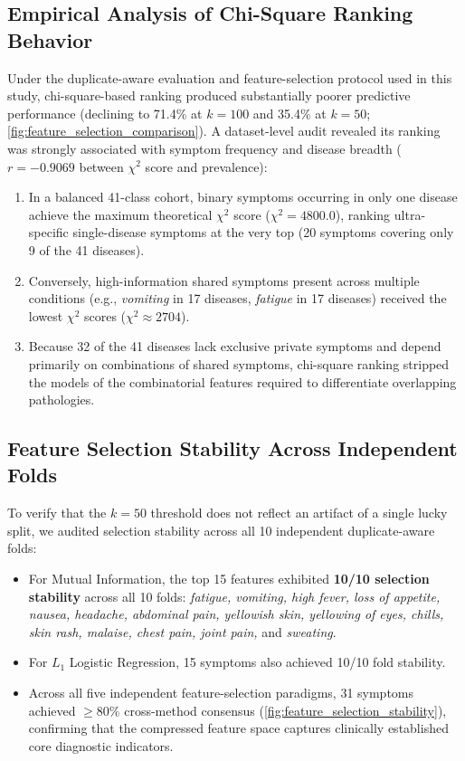 \subsection{Empirical Analysis of Chi-Square Ranking Behavior}
\label{subsec:chisquare_analysis}
Under the duplicate-aware evaluation and feature-selection protocol used in this study, chi-square-based ranking produced substantially poorer predictive performance (declining to 71.4\% at $k=100$ and 35.4\% at $k=50$; \cref{fig:feature_selection_comparison}). A dataset-level audit revealed its ranking was strongly associated with symptom frequency and disease breadth ($r = -0.9069$ between $\chi^2$ score and prevalence):
\begin{enumerate}
    \item In a balanced 41-class cohort, binary symptoms occurring in only one disease achieve the maximum theoretical $\chi^2$ score ($\chi^2 = 4800.0$), ranking ultra-specific single-disease symptoms at the very top (20 symptoms covering only 9 of the 41 diseases).
    \item Conversely, high-information shared symptoms present across multiple conditions (e.g., \emph{vomiting} in 17 diseases, \emph{fatigue} in 17 diseases) received the lowest $\chi^2$ scores ($\chi^2 \approx 2704$).
    \item Because 32 of the 41 diseases lack exclusive private symptoms and depend primarily on combinations of shared symptoms, chi-square ranking stripped the models of the combinatorial features required to differentiate overlapping pathologies.
\end{enumerate}

\subsection{Feature Selection Stability Across Independent Folds}
\label{subsec:stability_folds}
To verify that the $k=50$ threshold does not reflect an artifact of a single lucky split, we audited selection stability across all 10 independent duplicate-aware folds:
\begin{itemize}
    \item For Mutual Information, the top 15 features exhibited \textbf{10/10 selection stability} across all 10 folds: \emph{fatigue, vomiting, high fever, loss of appetite, nausea, headache, abdominal pain, yellowish skin, yellowing of eyes, chills, skin rash, malaise, chest pain, joint pain,} and \emph{sweating}.
    \item For $L_1$ Logistic Regression, 15 symptoms also achieved 10/10 fold stability.
    \item Across all five independent feature-selection paradigms, 31 symptoms achieved $\ge 80\%$ cross-method consensus (\cref{fig:feature_selection_stability}), confirming that the compressed feature space captures clinically established core diagnostic indicators.
\end{itemize}
